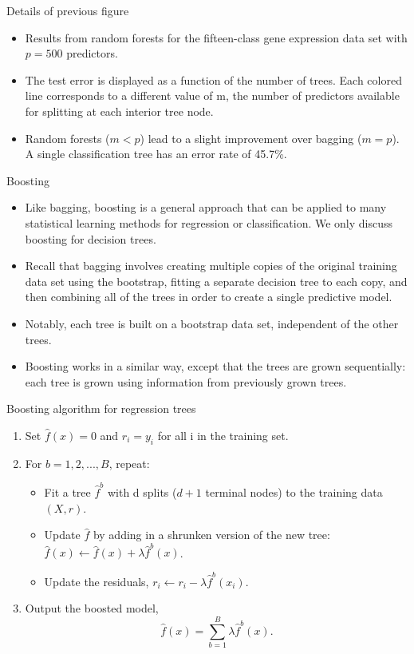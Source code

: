 \documentclass[aspectratio=169, 11pt]{beamer}
\begin{document}
\begin{frame}{Details of previous figure}
\begin{itemize}
    \item Results from random forests for the fifteen-class gene expression data set with $p=500$ predictors.
    \item The test error is displayed as a function of the number of trees. Each colored line corresponds to a different value of m, the number of predictors available for splitting at each interior tree node.
    \item Random forests ($m<p$) lead to a slight improvement over bagging ($m=p$). A single classification tree has an error rate of 45.7\%.
\end{itemize}
\end{frame}

\begin{frame}{Boosting}
\begin{itemize}
    \item Like bagging, boosting is a general approach that can be applied to many statistical learning methods for regression or classification. We only discuss boosting for decision trees.
    \item Recall that bagging involves creating multiple copies of the original training data set using the bootstrap, fitting a separate decision tree to each copy, and then combining all of the trees in order to create a single predictive model.
    \item Notably, each tree is built on a bootstrap data set, independent of the other trees.
    \item Boosting works in a similar way, except that the trees are grown sequentially: each tree is grown using information from previously grown trees.
\end{itemize}
\end{frame}

\begin{frame}{Boosting algorithm for regression trees}
\begin{enumerate}
    \item Set $\hat{f}(x)=0$ and $r_{i}=y_{i}$ for all i in the training set.
    \item For $b=1,2,...,B$, repeat:
    \begin{itemize}
        \item[2.1] Fit a tree $\hat{f}^{b}$ with d splits ($d+1$ terminal nodes) to the training data $(X, r)$.
        \item[2.2] Update $\hat{f}$ by adding in a shrunken version of the new tree: $\hat{f}(x)\leftarrow\hat{f}(x)+\lambda\hat{f}^{b}(x)$.
        \item[2.3] Update the residuals, $r_{i}\leftarrow r_{i}-\lambda\hat{f}^{b}(x_{i})$.
    \end{itemize}
    \item Output the boosted model,
    \begin{equation*}
    \hat{f}(x)=\sum_{b=1}^{B}\lambda\hat{f}^{b}(x).
    \end{equation*}
\end{enumerate}
\end{frame}
\end{document}
